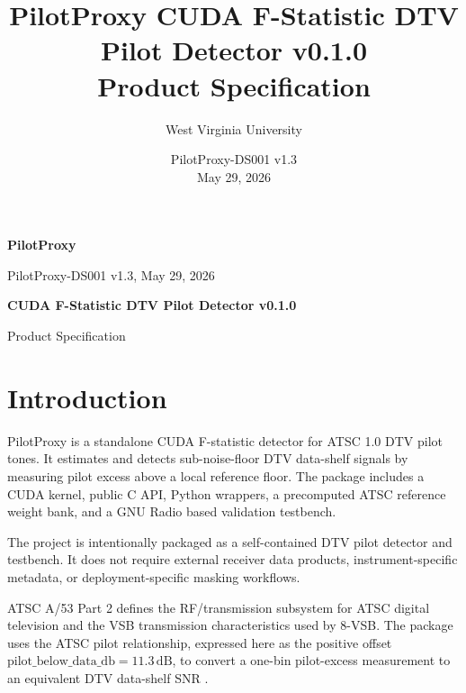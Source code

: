 \documentclass[10pt,letterpaper]{article}
\title{PilotProxy CUDA F-Statistic DTV Pilot Detector v0.1.0\\Product Specification}
\author{West Virginia University}
\date{PilotProxy-DS001 v1.3 \\ May 29, 2026}
\newcommand{\dB}{\,\mathrm{dB}}
\begin{document}
\thispagestyle{fancy}
{\sffamily
\begin{minipage}[t]{0.39\textwidth}
  {\fontsize{24}{26}\selectfont\bfseries\color{FStatRed}PilotProxy}\par
  {\small PilotProxy-DS001 v1.3, May 29, 2026}
\end{minipage}
\hfill
\begin{minipage}[t]{0.58\textwidth}
  \raggedleft
  {\fontsize{18}{20}\selectfont\bfseries CUDA F-Statistic DTV Pilot Detector v0.1.0}\par
  {\small Product Specification}
\end{minipage}
}

\vspace{0.14in}

\begin{minipage}[t]{0.48\textwidth}
\section*{Introduction}
PilotProxy is a standalone CUDA F-statistic detector for ATSC 1.0 DTV pilot tones.  It estimates and detects sub-noise-floor DTV data-shelf signals by measuring pilot excess above a local reference floor.  The package includes a CUDA kernel, public C API, Python wrappers, a precomputed ATSC reference weight bank, and a GNU Radio based validation testbench.

The project is intentionally packaged as a self-contained DTV pilot detector and testbench.  It does not require external receiver data products, instrument-specific metadata, or deployment-specific masking workflows.

ATSC A/53 Part 2 defines the RF/transmission subsystem for ATSC digital television and the VSB transmission characteristics used by 8-VSB.  The package uses the ATSC pilot relationship, expressed here as the positive offset \(\mathrm{pilot\_below\_data\_db}=11.3\dB\), to convert a one-bin pilot-excess measurement to an equivalent DTV data-shelf SNR \cite{atsc_a53_part2_2011}.


\end{minipage}
\end{document}
